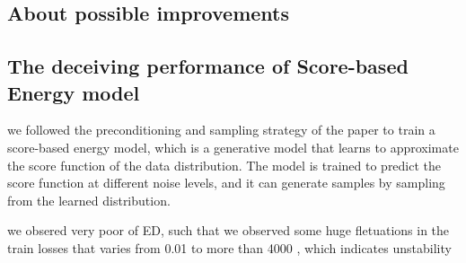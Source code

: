 \documentclass[twocolumn,superscriptaddress,aps]{revtex4-1}
\begin{document}
\subsection{About possible improvements}

\subsection{The deceiving performance of Score-based Energy model}

we followed the preconditioning and sampling strategy of the paper \cite{karras2022elucidating} to train a score-based energy model, which is a generative model that learns to approximate the score function of the data distribution. The model is trained to predict the score function at different noise levels, and it can generate samples by sampling from the learned distribution.

we obsered very poor of ED, such that we observed some huge fletuations in the train losses that varies from 0.01 to more than 4000 , which indicates unstability



\newpage



\newpage
\appendix
\end{document}
